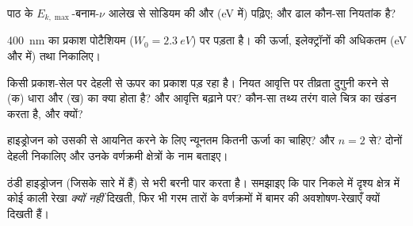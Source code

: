 \begin{exercise}[$\star$]\label{exo:g12:quantum-world:5}
पाठ के $E_{k,\max}$-बनाम-$\nu$ आलेख से सोडियम की  और
 (\unit{eV} में) पढ़िए; और ढाल कौन-सा नियतांक है?
\end{exercise}

\begin{exercise}[$\star\star$]\label{exo:g12:quantum-world:6}
\qty{400}{nm}  का प्रकाश पोटैशियम ($W_0 = \qty{2.3}{eV}$) पर पड़ता है।
 की ऊर्जा, इलेक्ट्रॉनों की अधिकतम 
(\unit{eV} और  में) तथा  निकालिए।
\end{exercise}

\begin{exercise}[$\star\star$]\label{exo:g12:quantum-world:7}
किसी प्रकाश-सेल पर देहली से ऊपर का प्रकाश पड़ रहा है। नियत आवृत्ति पर
तीव्रता दुगुनी करने से (क) धारा और (ख)  का क्या होता है?
और आवृत्ति बढ़ाने पर? कौन-सा तथ्य तरंग वाले चित्र का खंडन
करता है, और क्यों?
\end{exercise}

\begin{exercise}[$\star\star$]\label{exo:g12:quantum-world:8}
हाइड्रोजन  को उसकी  से आयनित करने के लिए
न्यूनतम कितनी ऊर्जा का  चाहिए? और $n = 2$ से? दोनों
देहली  निकालिए और उनके वर्णक्रमी क्षेत्रों के नाम बताइए।
\end{exercise}

\begin{exercise}[$\star\star$]\label{exo:g12:quantum-world:9}
 ठंडी हाइड्रोजन (जिसके सारे 
 में हैं) से भरी बरनी पार करता है। समझाइए कि पार निकले
 में दृश्य क्षेत्र में कोई काली रेखा \emph{क्यों नहीं} दिखती,
फिर भी गरम तारों के वर्णक्रमों में बामर की अवशोषण-रेखाएँ क्यों दिखती हैं।
\end{exercise}

